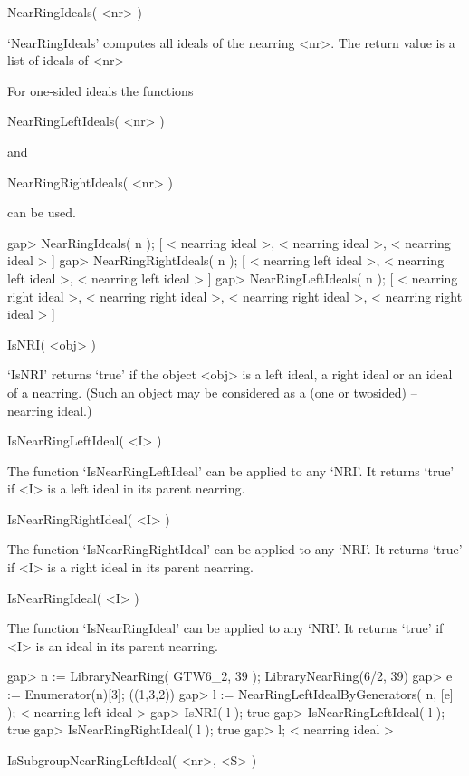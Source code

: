 \>NearRingIdeals( <nr> )

`NearRingIdeals'  computes all ideals of the nearring <nr>. The return value
is a list of ideals of <nr>

For one-sided ideals the functions

\>NearRingLeftIdeals( <nr> )

and

\>NearRingRightIdeals( <nr> )

can be used.

\beginexample
    gap> NearRingIdeals( n );
    [ < nearring ideal >, < nearring ideal >, < nearring ideal > ]
    gap> NearRingRightIdeals( n );
    [ < nearring left ideal >, < nearring left ideal >, 
      < nearring left ideal > ]
    gap> NearRingLeftIdeals( n );
    [ < nearring right ideal >, < nearring right ideal >, 
      < nearring right ideal >, < nearring right ideal > ]
\endexample



\>IsNRI( <obj> )

`IsNRI' returns `true' if the object <obj> is a left ideal, a right ideal or
an ideal of a nearring. (Such an object may be considered as a (one or
twosided) {\GAP} -- nearring ideal.)

\>IsNearRingLeftIdeal( <I> )

The function `IsNearRingLeftIdeal' can be applied to any `NRI'.
It returns `true' if <I> is a left ideal in its parent nearring.

\>IsNearRingRightIdeal( <I> )

The function `IsNearRingRightIdeal' can be applied to any `NRI'.
It returns `true' if <I> is a right ideal in its parent nearring.

\>IsNearRingIdeal( <I> )

The function `IsNearRingIdeal' can be applied to any `NRI'.
It returns `true' if <I> is an ideal in its parent nearring.

\beginexample
    gap> n := LibraryNearRing( GTW6_2, 39 );                      
    LibraryNearRing(6/2, 39)
    gap> e := Enumerator(n)[3];
    ((1,3,2))
    gap> l := NearRingLeftIdealByGenerators( n, [e] );
    < nearring left ideal >
    gap> IsNRI( l );
    true
    gap> IsNearRingLeftIdeal( l );
    true
    gap> IsNearRingRightIdeal( l );
    true
    gap> l;
    < nearring ideal >
\endexample

\>IsSubgroupNearRingLeftIdeal( <nr>, <S> )

